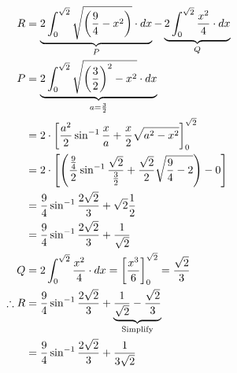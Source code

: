 \documentclass[14pt,fleqn]{extarticle}
\begin{document}
\begin{align}
	R &= \underbrace{2\int_{0}^{\sqrt{2}} \sqrt{\left(\frac{9}{4}-x^2 \right)}\cdot dx}_P - \underbrace{2\int_{0}^{\sqrt{2}} \frac{x^2}{4}\cdot dx}_Q \\ 
	P &= \underbrace{2\int_{0}^{\sqrt{2}} \sqrt{\left(\frac{3}{2} \right)^2 - x^2}\cdot dx }_{a = \frac{3}{2}} \\
	&= 2\cdot\left[ \frac{a^2}{2}\sin^{-1}\frac{x}{a}+ \frac{x}{2}\sqrt{a^2-x^2}\right]_0^{\sqrt{2}} \\
	&= 2\cdot\left[ \left(\frac{\frac{9}{4}}{2}\sin^{-1}\frac{\sqrt{2}}{\frac{3}{2}}+
\frac{\sqrt{2}}{2}\sqrt{\frac{9}{4}-2}\right)- 0\right] \\
&= \frac{9}{4}\sin^{-1}\frac{2\sqrt{2}}{3} + \sqrt{2}\frac{1}{2} \\
&=  \frac{9}{4}\sin^{-1}\frac{2\sqrt{2}}{3} + \frac{1}{\sqrt{2}} \\
Q &= 2\int_0^{\sqrt{2}}\frac{x^2}{4}\cdot dx = \left[ \frac{x^3}{6}\right]_0^{\sqrt{2}} = \frac{\sqrt{2}}{3} \\
\therefore R &= \frac{9}{4}\sin^{-1}\frac{2\sqrt{2}}{3} + 
\underbrace{\frac{1}{\sqrt{2}}- \frac{\sqrt{2}}{3}}_{\text{Simplify}} \\
&= \frac{9}{4}\sin^{-1}\frac{2\sqrt{2}}{3} + \frac{1}{3\sqrt{2}}
\end{align}
\end{document}
